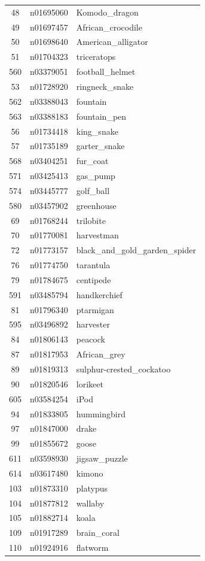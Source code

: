 \begin{table}
\begin{tabular}{cll}
48 & n01695060 & Komodo_dragon \\
49 & n01697457 & African_crocodile \\
50 & n01698640 & American_alligator \\
51 & n01704323 & triceratops \\
560 & n03379051 & football_helmet \\
53 & n01728920 & ringneck_snake \\
562 & n03388043 & fountain \\
563 & n03388183 & fountain_pen \\
56 & n01734418 & king_snake \\
57 & n01735189 & garter_snake \\
568 & n03404251 & fur_coat \\
571 & n03425413 & gas_pump \\
574 & n03445777 & golf_ball \\
580 & n03457902 & greenhouse \\
69 & n01768244 & trilobite \\
70 & n01770081 & harvestman \\
72 & n01773157 & black_and_gold_garden_spider \\
76 & n01774750 & tarantula \\
79 & n01784675 & centipede \\
591 & n03485794 & handkerchief \\
81 & n01796340 & ptarmigan \\
595 & n03496892 & harvester \\
84 & n01806143 & peacock \\
87 & n01817953 & African_grey \\
89 & n01819313 & sulphur-crested_cockatoo \\
90 & n01820546 & lorikeet \\
605 & n03584254 & iPod \\
94 & n01833805 & hummingbird \\
97 & n01847000 & drake \\
99 & n01855672 & goose \\
611 & n03598930 & jigsaw_puzzle \\
614 & n03617480 & kimono \\
103 & n01873310 & platypus \\
104 & n01877812 & wallaby \\
105 & n01882714 & koala \\
109 & n01917289 & brain_coral \\
110 & n01924916 & flatworm \\

\end{tabular}
\end{table}

